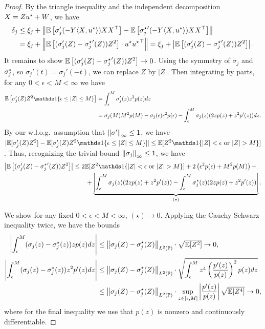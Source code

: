 \begin{proof}
  By the triangle inequality and the independent decomposition $X = Z u^\star
  + W$, we have
  \begin{align*}
    \delta_j & \leq \xi_j + \left\|{\mathbb{E}\left[\sigma_j'(-Y\langle X, u^\star\rangle) XX^\top\right] - \mathbb{E}\left[{\sigma_j^\star}'(-Y\langle X, u^\star\rangle) XX^\top\right] }\right\| \nonumber \\
    & = \xi_j + \left\|{\mathbb{E}\left[(\sigma_j'(Z)-{\sigma_j^\star}'(Z)) Z^2\right] \cdot u^\star {u^\star}^\top }\right\| = \xi_j + \left|\mathbb{E}\left[(\sigma_j'(Z)-{\sigma_j^\star}'(Z)) Z^2\right] \right|.
  \end{align*}
  It remains to show $\mathbb{E}\left[(\sigma_j'(Z)-{\sigma_j^\star}'(Z)) Z^2\right]
  \to 0$. Using the symmetry of $\sigma_j$ and $\sigma^\star_j$, so
  $\sigma_j'(t) = \sigma_j'(-t)$, we can replace $Z$ by $|Z|$. Then
  integrating by parts, for any $0 < \epsilon < M < \infty$ we have
  \begin{align*}
    \Ep \brk{\sigma_j'(Z) Z^2 \ind \{\epsilon \leq |Z| \leq M\}} & = \int_\epsilon^M \sigma_j'(z) z^2 p(z) dz \nonumber \\
    &= \sigma_j(M) M^2p(M) - \sigma_j(\epsilon) \epsilon^2 p(\epsilon)  - \int_\epsilon^M \sigma_j(z) (2z p(z) + z^2 p'(z)) dz.
  \end{align*}
  By our w.l.o.g.\ assumption that $\left\|{\sigma'}\right\|_\infty \leq 1$, we have $|\Ep
  [\sigma_j'(Z) Z^2] - \Ep [\sigma_j'(Z) Z^2 \ind \{\epsilon \leq |Z| \leq
    M\}]| \leq \Ep[Z^2 \ind\{|Z| < \epsilon \text{ or } |Z| >
    M\}]$. Thus, recognizing the trivial
  bound $\left\|{\sigma_j}\right\|_\infty \leq 1$, we have
  \begin{align*}
    \left|\E\left[(\sigma_j'(Z)-{\sigma_j\opt}'(Z)) Z^2\right] \right| &\leq 2 \Ep[Z^2 \ind\{|Z| < \epsilon \text{ or } |Z| > M\}] + 2 \prn{\epsilon^2 p(\epsilon) + M^2p(M)} + \nonumber \\
    & \qquad + \underbrace{\left|\int_\epsilon^M \sigma_j(z) (2z p(z) + z^2 p'(z)) -  \int_\epsilon^M \sigma_j\opt(z) (2z p(z) + z^2 p'(z))\right|}_{(\star)}.
  \end{align*}
 	
  We show for any fixed $0 < \epsilon < M < \infty$, $(\star) \to 0$. Applying
  the Cauchy-Schwarz inequality twice, we have the bounds
  \begin{align*}
    \left|\int_\epsilon^M (\sigma_j(z) - \sigma_j^\star(z)) z p(z) dz \right| &\leq \left\|{\sigma_j(Z) - \sigma_j^\star(Z)}\right\|_{L^2(\mathbb{P})} \cdot \sqrt{\mathbb{E}[Z^2]} \to 0, \\
    \left|\int_\epsilon^M (\sigma_j(z) - \sigma_j^\star(z)) z^2 p'(z) dz \right| & \leq  \left\|{\sigma_j(Z) - \sigma_j^\star(Z)}\right\|_{L^2(\mathbb{P})} \cdot \sqrt{\int_\epsilon^M z^4 \left({\frac{p'(z)}{p(z)}}\right)^2 p(z) dz} \nonumber \\
    & \leq \left\|{\sigma_j(Z) - \sigma_j^\star(Z)}\right\|_{L^2(\mathbb{P})} \cdot \sup_{z \in [\epsilon, M]} \left|\frac{p'(z)}{p(z)}\right| \sqrt{\mathbb{E}[Z^4]} \to 0,
  \end{align*}
  where for the final inequality we use that $p(z)$ is nonzero and
  continuously differentiable.


\end{proof}
